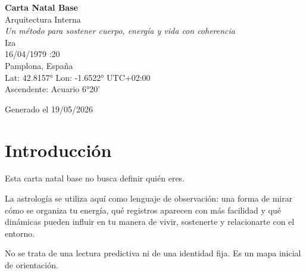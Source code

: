 \documentclass[11pt,a4paper]{article}
\begin{document}

\begin{titlepage}

\centering

\vspace*{1.5cm}

{\Huge\bfseries\color{azulai} Carta Natal Base}\\[0.5cm]

{\large\color{grisai} Arquitectura Interna}\\[0.4cm]

{\small\itshape\color{grisai}
Un método para sostener cuerpo, energía y vida con coherencia
}\\[2cm]

{\huge\color{doradoai} Iza}\\[1.5cm]

{\Large 16/04/1979 :20}\\[0.3cm]

{\Large Pamplona, España}\\[0.3cm]

{\normalsize
Lat: 42.8157° \quad
Lon: -1.6522° \quad
UTC+02:00
}\\[0.5cm]

{\normalsize
Ascendente: Acuario 6°20'
}\\[2.5cm]

\vfill

{\small Generado el 19/05/2026}

\end{titlepage}

\vspace*{2cm}


\section*{Introducción}

Esta carta natal base no busca definir quién eres.

La astrología se utiliza aquí como lenguaje de observación:
una forma de mirar cómo se organiza tu energía,
qué registros aparecen con más facilidad
y qué dinámicas pueden influir en tu manera de vivir, sostenerte y relacionarte con el entorno.

No se trata de una lectura predictiva ni de una identidad fija.
Es un mapa inicial de orientación.
\end{document}
